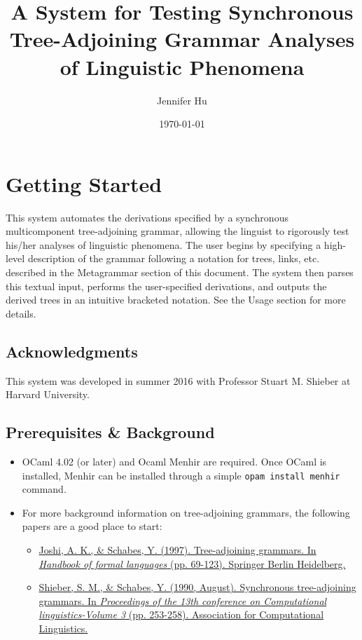 \documentclass[10.5pt]{article}
\title{A System for Testing Synchronous Tree-Adjoining Grammar Analyses of Linguistic Phenomena}
\author{Jennifer Hu}
\date{\today}
\newcommand{\code}[1]{\texttt{#1}}
\begin{document}
 
\maketitle
 
\tableofcontents 
 
\newpage

\section{Getting Started}

This system automates the derivations specified by a synchronous multicomponent tree-adjoining grammar, allowing the linguist to rigorously test his/her analyses of linguistic phenomena. The user begins by specifying a high-level description of the grammar following a notation for trees, links, etc. described in the Metagrammar section of this document. The system then parses this textual input, performs the user-specified derivations, and outputs the derived trees in an intuitive bracketed notation. See the Usage section for more details.

\subsection{Acknowledgments}
This system was developed in summer 2016 with Professor Stuart M. Shieber at Harvard University.

\subsection{Prerequisites \& Background}
  \begin{itemize}
    \item OCaml 4.02 (or later) and Ocaml Menhir are required. Once OCaml is installed, Menhir can be installed through a simple \code{opam install menhir} command. 
    \item For more background information on tree-adjoining grammars, the following papers are a good place to start:
    	\begin{itemize}
    		\item \href{http://www.seas.upenn.edu/~cis477/ltag-paper.pdf}{Joshi, A. K., \& Schabes, Y. (1997). Tree-adjoining grammars. In \emph{Handbook of formal languages} (pp. 69-123). Springer Berlin Heidelberg.}
    		\item \href{https://dash.harvard.edu/handle/1/2265291}{Shieber, S. M., \& Schabes, Y. (1990, August). Synchronous tree-adjoining grammars. In \emph{Proceedings of the 13th conference on Computational linguistics-Volume 3} (pp. 253-258). Association for Computational Linguistics.}
		\end{itemize}    	 
  \end{itemize}
\end{document}
